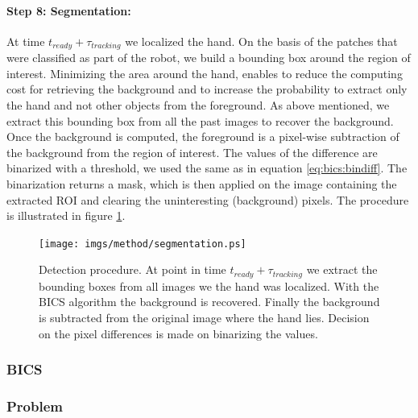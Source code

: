 \documentclass[conference]{IEEEtran}
\begin{document}
\paragraph{Step 8: Segmentation:}
\label{halose:se8}
% 
At time $t_{ready}+ \tau_{tracking}$ we localized the hand. On the basis of the patches that were classified as part of the robot, we build a bounding box around the region of interest. Minimizing the area around the hand, enables to reduce the computing cost for retrieving the background and to increase the probability to extract only the hand and not other objects from the foreground. As above mentioned, we extract this bounding box from all the past images to recover the background. Once the background is computed, the foreground is a pixel-wise subtraction of the background from the region of interest. The values of the difference are binarized with a threshold, we used the same as in equation \ref{eq:bics:bindiff}. The binarization returns a mask, which is then applied on the image containing the extracted ROI and clearing the uninteresting (background) pixels. The procedure is illustrated in figure \ref{fig:segmentation}.
%
\begin{figure}[ht]
	\begin{center}
		\texttt{[image: imgs/method/segmentation.ps]}
	\end{center}
		\caption[Detection procedure. ]{Detection procedure. At point in time $t_{ready}+ \tau_{tracking}$ we extract the bounding boxes from all images we the hand was localized. With the BICS algorithm the background is recovered. Finally the background is subtracted from the original image where the hand lies. Decision on the pixel differences is made on binarizing the values.}
		\label{fig:segmentation}
\end{figure}
%
\subsubsection{BICS}
\subsubsection{Problem}

%
%
\end{document}
